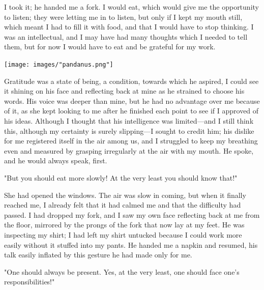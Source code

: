 \documentclass[
]{memoir}
\newlength{\drop}%
\begin{document}
I took it; he handed me a fork. I would eat, which would give me the
opportunity to listen; they were letting me in to listen, but only if I
kept my mouth still, which meant I had to fill it with food, and that I
would have to stop thinking. I was an intellectual, and I may have had
many thoughts which I needed to tell them, but for now I would have to
eat and be grateful for my work.

\begin{center}\texttt{[image: images/"pandanus.png"]}\end{center}

Gratitude was a state of being, a condition, towards which he aspired, I
could see it shining on his face and reflecting back at mine as he
strained to choose his words. His voice was deeper than mine, but he had
no advantage over me because of it, as she kept looking to me after he
finished each point to see if I approved of his ideas. Although I
thought that his intelligence was limited---and I still think this,
although my certainty is surely slipping---I sought to credit him; his
dislike for me registered itself in the air among us, and I struggled to
keep my breathing even and measured by grasping irregularly at the air
with my mouth. He spoke, and he would always speak, first.

"But you should eat more slowly! At the very least you should know
that!"

She had opened the windows. The air was slow in coming, but when it
finally reached me, I already felt that it had calmed me and that the
difficulty had passed. I had dropped my fork, and I saw my own face
reflecting back at me from the floor, mirrored by the prongs of the fork
that now lay at my feet. He was inspecting my shirt; I had left my shirt
untucked because I could work more easily without it stuffed into my
pants. He handed me a napkin and resumed, his talk easily inflated by
this gesture he had made only for me.

"One should always be present. Yes, at the very least, one should face
one's responsibilities!"
\end{document}

